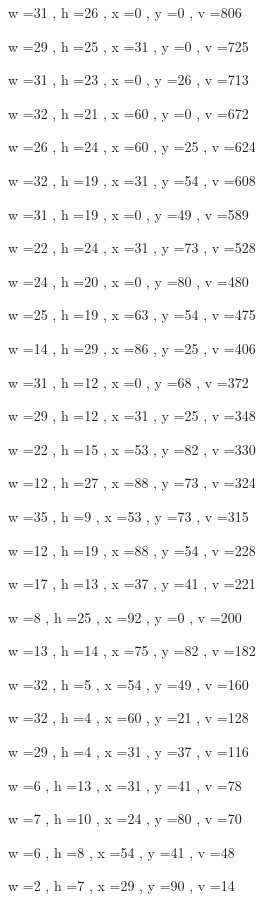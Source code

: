 \documentclass[11pt]{article}
\begin{document}
w =31 , h =26 , x =0 , y =0 , v =806
\par
w =29 , h =25 , x =31 , y =0 , v =725
\par
w =31 , h =23 , x =0 , y =26 , v =713
\par
w =32 , h =21 , x =60 , y =0 , v =672
\par
w =26 , h =24 , x =60 , y =25 , v =624
\par
w =32 , h =19 , x =31 , y =54 , v =608
\par
w =31 , h =19 , x =0 , y =49 , v =589
\par
w =22 , h =24 , x =31 , y =73 , v =528
\par
w =24 , h =20 , x =0 , y =80 , v =480
\par
w =25 , h =19 , x =63 , y =54 , v =475
\par
w =14 , h =29 , x =86 , y =25 , v =406
\par
w =31 , h =12 , x =0 , y =68 , v =372
\par
w =29 , h =12 , x =31 , y =25 , v =348
\par
w =22 , h =15 , x =53 , y =82 , v =330
\par
w =12 , h =27 , x =88 , y =73 , v =324
\par
w =35 , h =9 , x =53 , y =73 , v =315
\par
w =12 , h =19 , x =88 , y =54 , v =228
\par
w =17 , h =13 , x =37 , y =41 , v =221
\par
w =8 , h =25 , x =92 , y =0 , v =200
\par
w =13 , h =14 , x =75 , y =82 , v =182
\par
w =32 , h =5 , x =54 , y =49 , v =160
\par
w =32 , h =4 , x =60 , y =21 , v =128
\par
w =29 , h =4 , x =31 , y =37 , v =116
\par
w =6 , h =13 , x =31 , y =41 , v =78
\par
w =7 , h =10 , x =24 , y =80 , v =70
\par
w =6 , h =8 , x =54 , y =41 , v =48
\par
w =2 , h =7 , x =29 , y =90 , v =14
\par
\newpage
\end{document}
